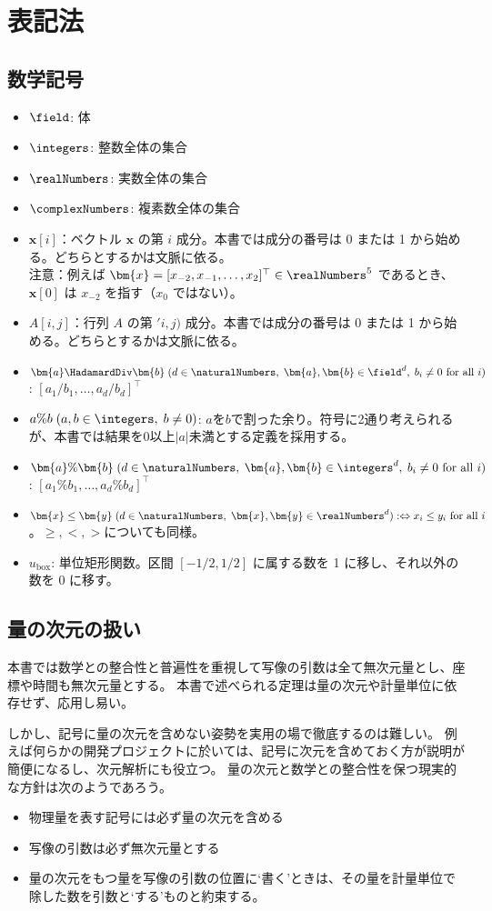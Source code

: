 \part{表記法}
	\chapter{数学記号}
		\newcommand*{\uBox}{u_\text{box}}
		\begin{itemize}
			\item $\field$: 体
			\item $\integers$: 整数全体の集合
			\item $\realNumbers$: 実数全体の集合
			\item $\complexNumbers$: 複素数全体の集合
			\item $\bm{x}[i]$：ベクトル $\bm{x}$ の第 $i$ 成分。本書では成分の番号は 0 または 1 から始める。どちらとするかは文脈に依る。\\
			注意：例えば $\bm{x} = [x_{-2},x_{-1},\dots,x_2]^\top\in\realNumbers^5$ であるとき、$\bm{x}[0]$ は $x_{-2}$ を指す（$x_0$ ではない）。
			\item $A[i,j]$：行列 $A$ の第 $'i,j)$ 成分。本書では成分の番号は 0 または 1 から始める。どちらとするかは文脈に依る。
			\item $\bm{a} \HadamardDiv \bm{b}\;(d \in \naturalNumbers,\;\bm{a},\bm{b} \in \field^d,\;b_i\neq 0 \text{ for all }i)$: $[a_1/b_1,\dots,a_d/b_d]^\top$
			\item $a\%b\;(a,b\in\integers,\;b\neq 0)$: $a$を$b$で割った余り。符号に2通り考えられるが、本書では結果を0以上$|a|$未満とする定義を採用する。
			\item $\bm{a}\%\bm{b}\;(d\in\naturalNumbers,\;\bm{a},\bm{b} \in \integers^d,\; b_i\neq 0 \text{ for all }i)$: $[a_1\%b_1,\dots,a_d\%b_d]^\top$
			\item $\bm{x} \leq \bm{y}\;(d\in\naturalNumbers,\;\bm{x},\bm{y} \in \realNumbers^d) :\Leftrightarrow x_i \leq y_i \text{ for all }i$。$\geq, <, >$についても同様。
			\item $\uBox$: 単位矩形関数。区間 $[-1/2,1/2]$ に属する数を 1 に移し、それ以外の数を 0 に移す。
		\end{itemize}
	\chapter{量の次元の扱い}
		本書では数学との整合性と普遍性を重視して写像の引数は全て無次元量とし、座標や時間も無次元量とする。
		本書で述べられる定理は量の次元や計量単位に依存せず、応用し易い。
		\par
		しかし、記号に量の次元を含めない姿勢を実用の場で徹底するのは難しい。
		例えば何らかの開発プロジェクトに於いては、記号に次元を含めておく方が説明が簡便になるし、次元解析にも役立つ。
		量の次元と数学との整合性を保つ現実的な方針は次のようであろう。
		\begin{itemize}
			\item 物理量を表す記号には必ず量の次元を含める
			\item 写像の引数は必ず無次元量とする
			\item 量の次元をもつ量を写像の引数の位置に‘書く’ときは、その量を計量単位で除した数を引数と‘する’ものと約束する。
		\end{itemize}
